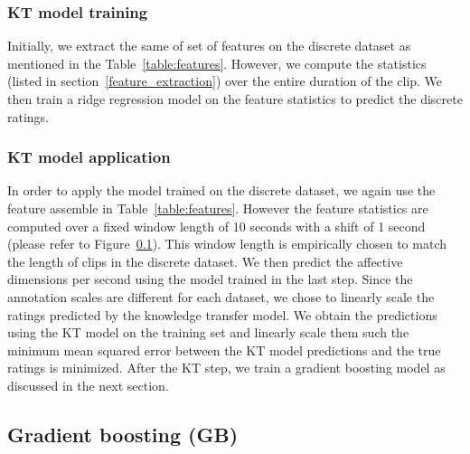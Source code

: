 \documentclass{article}
\begin{document}
\subsubsection{KT model training}
Initially, we extract the same of set of features on the discrete dataset as mentioned in the Table~\ref{table:features}.
However, we compute the statistics (listed in section~\ref{feature_extraction}) over the entire duration of the clip.
We then train a ridge regression model on the feature statistics to predict the discrete ratings.

\subsubsection{KT model application}
In order to apply the model trained on the discrete dataset, we again use the feature assemble in Table~\ref{table:features}.
However the feature statistics are computed over a fixed window length of 10 seconds with a shift of 1 second (please refer to Figure~\ref{}). 
This window length is empirically chosen to match the length of clips in the discrete dataset.
We then predict the affective dimensions per second using the model trained in the last step.
Since the annotation scales are different for each dataset, we chose to linearly scale the ratings predicted by the knowledge transfer model.
We obtain the predictions using the KT model on the training set and linearly scale them such the minimum mean squared error between the KT model predictions and the true ratings is minimized. 
After the KT step, we train a gradient boosting model as discussed in the next section. 


\subsection{Gradient boosting (GB)}
\end{document}
